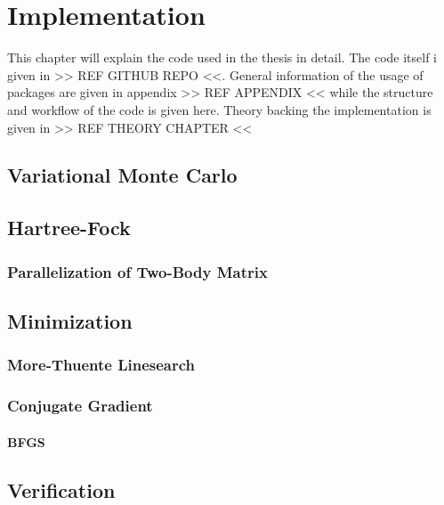 \chapter{Implementation \label{chapter:6}}
    This chapter will explain the code used in the thesis in detail. The code
    itself i given in >> REF GITHUB REPO <<. General information of the usage
    of packages are given in appendix >> REF APPENDIX << while the structure
    and workflow of the code is given here. Theory backing the implementation
    is given in >> REF THEORY CHAPTER <<

\section{Variational Monte Carlo}
\section{Hartree-Fock}
\subsection{Parallelization of Two-Body Matrix}
\section{Minimization}
\subsection{More-Thuente Linesearch}
\subsection{Conjugate Gradient}
\subsubsection{BFGS}
\section{Verification\label{sec:verification}}
